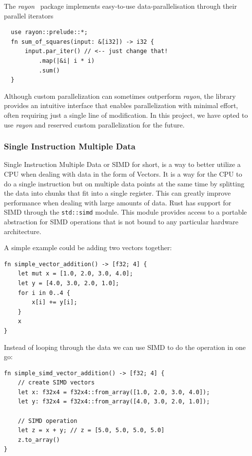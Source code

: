 \documentclass[11pt]{report}
\theoremstyle{definition}
\theoremstyle{plain}
\begin{document}
The \textit{rayon}~\cite{rayon} package implements easy-to-use data-parallelisation through their parallel iterators
\begin{verbatim}
  use rayon::prelude::*;
  fn sum_of_squares(input: &[i32]) -> i32 {
      input.par_iter() // <-- just change that!
          .map(|&i| i * i)
          .sum()
  }
\end{verbatim}

Although custom parallelization can sometimes outperform \textit{rayon}, the library provides an intuitive interface that enables parallelization with minimal effort, often requiring just a single line of modification. In this project, we have opted to use \textit{rayon} and reserved custom parallelization for the future.

\subsubsection{Single Instruction Multiple Data}
Single Instruction Multiple Data or SIMD for short, is a way to better utilize a CPU when dealing with data in the form of Vectors. It is a way for the CPU to do a single instruction but on multiple data points at the same time by splitting the data into chunks that fit into a single register. This can greatly improve performance when dealing with large amounts of data. Rust has support for SIMD through the \texttt{std::simd} module. This module provides access to a portable abstraction for SIMD operations that is not bound to any particular hardware architecture.

A simple example could be adding two vectors together:
\begin{verbatim}
fn simple_vector_addition() -> [f32; 4] {
    let mut x = [1.0, 2.0, 3.0, 4.0];
    let y = [4.0, 3.0, 2.0, 1.0];
    for i in 0..4 {
        x[i] += y[i];
    }
    x
}

\end{verbatim}

Instead of looping through the data we can use SIMD to do the operation in one go:

\begin{verbatim}
fn simple_simd_vector_addition() -> [f32; 4] {
    // create SIMD vectors
    let x: f32x4 = f32x4::from_array([1.0, 2.0, 3.0, 4.0]);
    let y: f32x4 = f32x4::from_array([4.0, 3.0, 2.0, 1.0]);

    // SIMD operation
    let z = x + y; // z = [5.0, 5.0, 5.0, 5.0]
    z.to_array() 
}
\end{verbatim}
\end{document}
